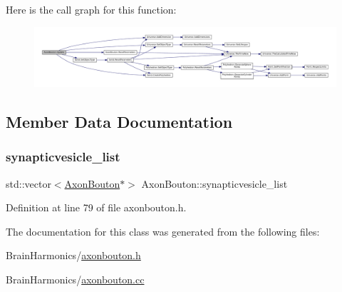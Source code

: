 Here is the call graph for this function\+:\nopagebreak
\begin{figure}[H]
\begin{center}
\leavevmode
\includegraphics[width=350pt]{class_axon_bouton_a26f89bac681b8f0894fe1ae249733917_cgraph}
\end{center}
\end{figure}


\subsection{Member Data Documentation}
\mbox{\label{class_axon_bouton_ad5b4e9b5fefb2ad9e6dfe5ad91be2dd7}} 
\subsubsection{\texorpdfstring{synapticvesicle\+\_\+list}{synapticvesicle\_list}}
{\footnotesize\ttfamily std\+::vector$<$\mbox{\hyperlink{class_axon_bouton}{Axon\+Bouton}}$\ast$$>$ Axon\+Bouton\+::synapticvesicle\+\_\+list\hspace{0.3cm}{\ttfamily [protected]}}



Definition at line 79 of file axonbouton.\+h.



The documentation for this class was generated from the following files\+:\begin{DoxyCompactItemize}
\item 
Brain\+Harmonics/\mbox{\hyperlink{axonbouton_8h}{axonbouton.\+h}}\item 
Brain\+Harmonics/\mbox{\hyperlink{axonbouton_8cc}{axonbouton.\+cc}}\end{DoxyCompactItemize}
